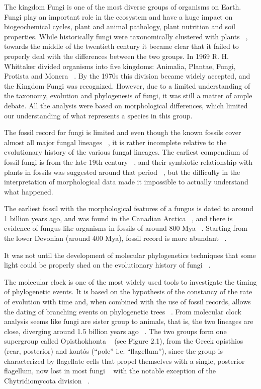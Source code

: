 The kingdom Fungi is one of the most diverse groups of organisms on Earth. Fungi play an important role in the ecosystem and have a huge impact on biogeochemical cycles, plant and animal pathology, plant nutrition and soil properties.
While historically fungi were taxonomically clustered with plants ~\citep{copeland1938, copeland1956}, towards the middle of the twentieth century it became clear that it failed to properly deal with the differences between the two groups. In 1969 R. H. Whittaker divided organisms into five kingdoms: Animalia, Plantae, Fungi, Protista and Monera ~\citep{whittaker1969}. By the 1970s this division became widely accepted, and the Kingdom Fungi was recognized.
However, due to a limited understanding of the taxonomy, evolution and phylogenesis of fungi, it was still a matter of ample debate. All the analysis were based on morphological differences, which limited our understanding of what represents a species in this group.

The fossil record for fungi is limited and even though the known fossils cover almost all major fungal lineages ~\citep{lucking2009}, it is rather incomplete relative to the evolutionary history of the various fungal lineages. The earliest compendium of fossil fungi is from the late 19th century ~\citep{meschinelli1898}, and their symbiotic relationship with plants in fossils was suggested around that period ~\citep{renault1896}, but the difficulty in the interpretation of morphological data made it impossible to actually understand what happened.

The earliest fossil with the morphological features of a fungus is dated to around 1 billion years ago, and was found in the Canadian Arctica ~\citep{loron2019}, and there is evidence of fungus-like organisms in fossils of around 800 Mya ~\citep{bonneville2020}.
Starting from the lower Devonian (around 400 Mya), fossil record is more abundant ~\citep{lucking2009}.

It was not until the development of molecular phylogenetics techniques that some light could be properly shed on the evolutionary history of fungi ~\citep{james2006}.

The molecular clock is one of the most widely used tools to investigate the timing of phylogenetic events. It is based on the hypothesis of the constancy of the rate of evolution with time and, when combined with the use of fossil records, allows the dating of branching events on phylogenetic trees ~\citep{lepage2007, weir2008}.
From molecular clock analysis seems like fungi are sister group to animals, that is, the two lineages are close, diverging around 1.5 billion years ago ~\citep{wang1999}. The two groups form one supergroup called Opisthokhonta ~\citep{cavalier-smith1987} (see Figure 2.1), from the Greek opísthios (rear, posterior) and kontós (``pole'' i.e. ``flagellum''), since the group is characterized by flagellate cells that propel themselves with a single, posterior flagellum, now lost in most fungi ~\citep{steenkamp2006} with the notable exception of the Chytridiomycota division ~\citep{james2006a}.

